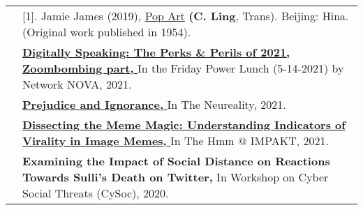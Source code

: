 \documentclass[letterpaper, 11pt]{article}
\begin{document}
\begin{longtable}{p{1.3in}p{4.8in}}
& [1]. Jamie James (2019), \href{https://book.douban.com/subject/35220441/?icn=index-topchart-subject}{Pop Art} \textbf{(C. Ling}, Trans). Beijing: Hina. (Original work published in 1954).\\





{\color{OliveGreen}{Invited Talks}} 

& \href{https://www.youtube.com/watch?v=JB6-rnlVD6g&t=8s}{\textbf{Digitally Speaking: The Perks \& Perils of 2021, Zoombombing part, }} {In the Friday Power Lunch (5-14-2021) by Network NOVA, 2021.}\\

& \href{https://www.bilibili.com/video/BV1py4y1b7d8?from=search&seid=10583162510465884129}{\textbf{Prejudice and Ignorance, }} {In The Neureality, 2021.}\\

& \href{https://www.youtube.com/watch?v=Np50JrIVr1A&t=5756s}{\textbf{Dissecting the Meme Magic: Understanding Indicators of Virality in Image Memes, }} {In The Hmm @ IMPAKT, 2021.}\\

& \textbf{Examining the Impact of Social Distance on Reactions Towards Sulli’s Death on Twitter, } {In Workshop on Cyber Social Threats (CySoc), 2020.}\\


\end{longtable}
\end{document}
